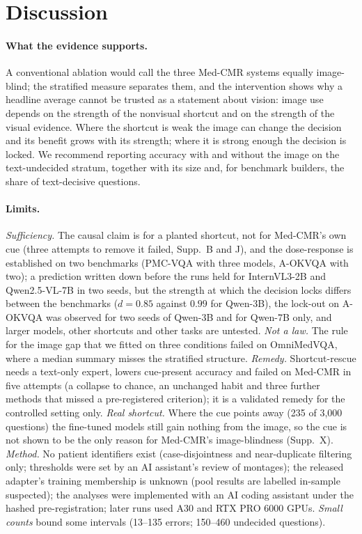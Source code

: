 \section{Discussion}
\label{sec:disc}

\paragraph{What the evidence supports.}
A conventional ablation would call the three Med-CMR systems equally image-blind; the stratified measure separates them, and the intervention shows why a headline average cannot be trusted as a statement about vision: image use depends on the strength of the nonvisual shortcut and on the strength of the visual evidence.
Where the shortcut is weak the image can change the decision and its benefit grows with its strength; where it is strong enough the decision is locked.
We recommend reporting accuracy with and without the image on the text-undecided stratum, together with its size and, for benchmark builders, the share of text-decisive questions.

\paragraph{Limits.}
\emph{Sufficiency.} The causal claim is for a planted shortcut, not for Med-CMR's own cue (three attempts to remove it failed, Supp.~B and J), and the dose-response is established on two benchmarks (PMC-VQA with three models, A-OKVQA with two); a prediction written down before the runs held for InternVL3-2B and Qwen2.5-VL-7B in two seeds, but the strength at which the decision locks differs between the benchmarks ($d=0.85$ against $0.99$ for Qwen-3B), the lock-out on A-OKVQA was observed for two seeds of Qwen-3B and for Qwen-7B only, and larger models, other shortcuts and other tasks are untested.
\emph{Not a law.} The rule for the image gap that we fitted on three conditions failed on OmniMedVQA, where a median summary misses the stratified structure.
\emph{Remedy.} Shortcut-rescue needs a text-only expert, lowers cue-present accuracy and failed on Med-CMR in five attempts (a collapse to chance, an unchanged habit and three further methods that missed a pre-registered criterion); it is a validated remedy for the controlled setting only.
\emph{Real shortcut.} Where the cue points away (235 of 3{,}000 questions) the fine-tuned models still gain nothing from the image, so the cue is not shown to be the only reason for Med-CMR's image-blindness (Supp.~X).
\emph{Method.} No patient identifiers exist (case-disjointness and near-duplicate filtering only; thresholds were set by an AI assistant's review of montages); the released adapter's training membership is unknown (pool results are labelled in-sample suspected); the analyses were implemented with an AI coding assistant under the hashed pre-registration; later runs used A30 and RTX PRO 6000 GPUs.
\emph{Small counts} bound some intervals (13--135 errors; 150--460 undecided questions).

